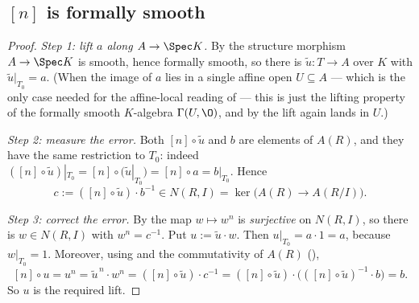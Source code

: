 \subsection{$[n]$ is formally smooth}\label{sec:av-etale-smooth}

\begin{proof}
\emph{Step 1: lift $a$ along $A\to\Spec K$.}  By  the
structure morphism $A\to\Spec K$ is smooth, hence formally smooth, so there is
$\tilde u\colon T\to A$ over $K$ with $\tilde u|_{T_0}=a$.  (When the image of
$a$ lies in a single affine open $U\subseteq A$ --- which is the only case
needed for the affine-local reading of  ---
this is just the lifting property of the formally smooth $K$-algebra
$\Gamma(U,\O)$, and by  the lift again lands in
$U$.)

\emph{Step 2: measure the error.}  Both $[n]\circ\tilde u$ and $b$ are elements
of $A(R)$, and they have the same restriction to $T_0$: indeed
$([n]\circ\tilde u)|_{T_0}=[n]\circ(\tilde u|_{T_0})=[n]\circ a=b|_{T_0}$.
Hence
\[
  c:=([n]\circ\tilde u)\cdot b^{-1}\in
  N(R,I)=\ker\bigl(A(R)\to A(R/I)\bigr).
\]

\emph{Step 3: correct the error.}  By  the map
$w\mapsto w^n$ is \emph{surjective} on $N(R,I)$, so there is $w\in N(R,I)$ with
$w^n=c^{-1}$.  Put $u:=\tilde u\cdot w$.  Then $u|_{T_0}=a=a$, because
$w|_{T_0}=1$.  Moreover, using  and the commutativity
of $A(R)$ (),
\[
  [n]\circ u=u^n=\tilde u^{\,n}\cdot w^n=([n]\circ\tilde u)\cdot c^{-1}
  =([n]\circ\tilde u)\cdot\bigl(([n]\circ\tilde u)^{-1}\cdot b\bigr)=b .
\]
So $u$ is the required lift.
\end{proof}

